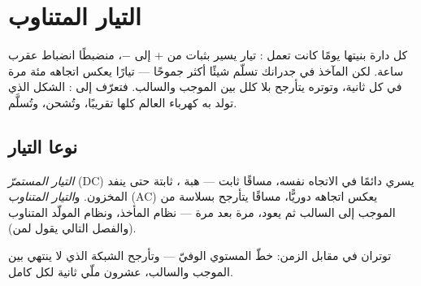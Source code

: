 \chapter{التيار المتناوب}\label{ch:g9:alternating-current}

كل دارة بنيتها يومًا كانت تعمل : تيار يسير بثبات من $+$
إلى $-$، منضبطًا انضباط عقرب ساعة. لكن المآخذ في جدرانك تسلّم
شيئًا أكثر جموحًا --- تيارًا يعكس اتجاهه مئة مرة في كل ثانية،
وتوتره يتأرجح بلا كلل بين الموجب والسالب. فتعرّف إلى : الشكل الذي تولد به كهرباء العالم كلها تقريبًا،
وتُشحن، وتُسلَّم.

\section{نوعا التيار}

\begin{definition}\label{def:g9:alternating-current:dcac}
\emph{التيار المستمرّ} (DC) يسري دائمًا في
الاتجاه نفسه، مساقًا  ثابت --- هبة ، ثابتة حتى
ينفد المخزون. و\emph{التيار المتناوب} (AC)
يعكس اتجاهه دوريًّا، مساقًا  يتأرجح بسلاسة من الموجب إلى
السالب ثم يعود، مرة بعد مرة --- نظام المأخذ، ونظام المولّد
المتناوب (والفصل التالي يقول لمن).
\end{definition}

\begin{omfigure}

{\small توتران في مقابل الزمن: خطّ  المستوي الوفيّ ---
وتأرجح الشبكة الذي لا ينتهي بين الموجب والسالب، عشرون ملّي
ثانية لكل  كامل.}
\end{omfigure}

